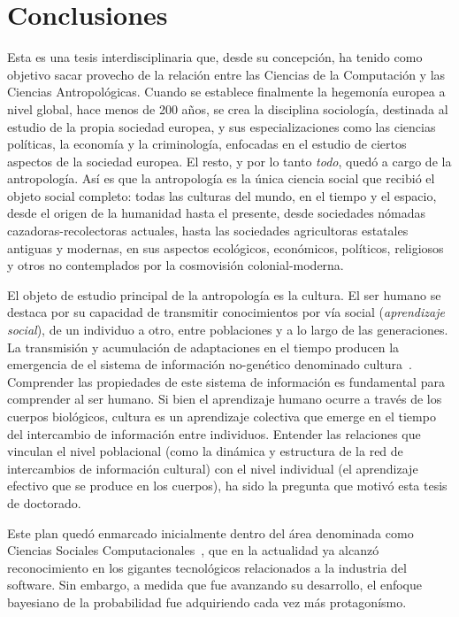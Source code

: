 \documentclass[a4paper,11pt]{book}
\theoremstyle{definition}
\begin{document}
\chapter{Conclusiones}

Esta es una tesis interdisciplinaria que, desde su concepci\'on, ha tenido como objetivo sacar provecho de la relaci\'on entre las Ciencias de la Computaci\'on y las Ciencias Antropol\'ogicas.
%
Cuando se establece finalmente la hegemon\'ia europea a nivel global, hace menos de 200 a\~nos, se crea la disciplina sociolog\'ia, destinada al estudio de la propia sociedad europea, y sus especializaciones como las ciencias pol\'iticas, la econom\'ia y la criminolog\'ia, enfocadas en el estudio de ciertos aspectos de la sociedad europea.
%
El resto, y por lo tanto \emph{todo}, qued\'o a cargo de la antropolog\'ia.
%
As\'i es que la antropolog\'ia es la \'unica ciencia social que recibi\'o el objeto social completo: todas las culturas del mundo, en el tiempo y el espacio, desde el origen de la humanidad hasta el presente, desde sociedades n\'omadas cazadoras-recolectoras actuales, hasta las sociedades agricultoras estatales antiguas y modernas, en sus aspectos ecol\'ogicos, econ\'omicos, pol\'iticos, religiosos y otros no contemplados por la cosmovisi\'on colonial-moderna.


El objeto de estudio principal de la antropolog\'ia es la cultura.
%
El ser humano se destaca por su capacidad de transmitir conocimientos por v\'ia social (\emph{aprendizaje social}), de un individuo a otro, entre poblaciones y a lo largo de las generaciones.
%
La transmisi\'on y acumulaci\'on de adaptaciones en el tiempo producen la emergencia de el sistema de informaci\'on no-gen\'etico denominado cultura~\cite{Tomasello1993, Boyd2011}.
%
Comprender las propiedades de este sistema de informaci\'on es fundamental para comprender al ser humano.
%
Si bien el aprendizaje humano ocurre a trav\'es de los cuerpos biol\'ogicos, cultura es un aprendizaje colectiva que emerge en el tiempo del intercambio de informaci\'on entre individuos.
%
Entender las relaciones que vinculan el nivel poblacional (como la din\'amica y estructura de la red de intercambios de informaci\'on cultural) con el nivel individual (el aprendizaje efectivo que se produce en los cuerpos), ha sido la pregunta que motiv\'o esta tesis de doctorado.


Este plan qued\'o enmarcado inicialmente dentro del \'area denominada como Ciencias Sociales Computacionales~\cite{Lazer2009, Lazer2020}, que en la actualidad ya alcanz\'o reconocimiento en los gigantes tecnol\'ogicos relacionados a la industria del software.
%
Sin embargo, a medida que fue avanzando su desarrollo, el enfoque bayesiano de la probabilidad fue adquiriendo cada vez m\'as protagon\'ismo.
\end{document}
